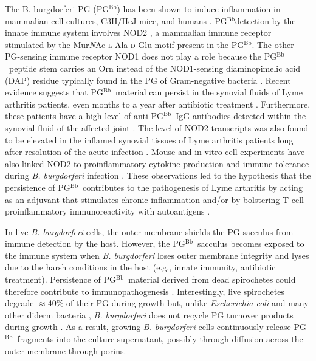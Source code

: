 \documentclass[twoside, watermark]{zHenriquesLab-StyleBioRxiv}
\newcommand{\pgbb}{PG$^\text{Bb}$}
\newcommand{\NAM}{Mur\textit{N}Ac}
\newcommand{\scl}{\textsc{l}} %
\newcommand{\scd}{\textsc{d}} %
\begin{document}
\vspace{1mm}
The B. burgdorferi PG (\pgbb ) has been shown to induce inflammation in mammalian cell cultures, C3H/HeJ mice, and humans \cite{Beck1990,Jutras2019}. \pgbb detection by the innate immune system involves NOD2 \cite{Jutras2019}, a mammalian immune receptor stimulated by the \NAM-\scl-Ala-\scd-Glu motif \cite{Chamaillard2003,Girardin2003} present in the \pgbb. The other PG-sensing immune receptor NOD1 does not play a role because the \pgbb~peptide stem carries an Orn instead of the NOD1-sensing diaminopimelic acid (DAP) residue typically found in the PG of Gram-negative bacteria \cite{Girardin2003,Jutras2019}. Recent evidence suggests that \pgbb~material can persist in the synovial fluids of Lyme arthritis patients, even months to a year after antibiotic treatment \cite{Jutras2019}. Furthermore, these patients have a high level of anti-\pgbb~IgG antibodies detected within the synovial fluid of the affected joint \cite{Jutras2019}. The level of NOD2 transcripts was also found to be elevated in the inflamed synovial tissues of Lyme arthritis patients long after resolution of the acute infection \cite{Lochhead2019}. Mouse and in vitro cell experiments have also linked NOD2 to proinflammatory cytokine production and immune tolerance during \textit{B. burgdorferi} infection \cite{Oosting2010,Petnicki2011}. These observations led to the hypothesis that the persistence of \pgbb~contributes to the pathogenesis of Lyme arthritis \cite{Jutras2019} by acting as an adjuvant that stimulates chronic inflammation and/or by bolstering T cell proinflammatory immunoreactivity with autoantigens \cite{Rouse2024}.

\vspace{1mm}
In live \textit{B. burgdorferi} cells, the outer membrane shields the PG sacculus from immune detection by the host. However, the \pgbb~sacculus becomes exposed to the immune system when \textit{B. burgdorferi} loses outer membrane integrity and lyses due to the harsh conditions in the host (e.g., innate immunity, antibiotic treatment). Persistence of \pgbb~material derived from dead spirochetes could therefore contribute to immunopathogenesis \cite{Jutras2019}. Interestingly, live spirochetes degrade $\approx$40\% of their PG during growth but, unlike \textit{Escherichia coli} and many other diderm bacteria \cite{Park2008}, \textit{B. burgdorferi} does not recycle PG turnover products during growth \cite{Jutras2019}. As a result, growing \textit{B. burgdorferi} cells continuously release \pgbb~fragments into the culture supernatant, possibly through diffusion across the outer membrane through porins. 
\end{document}
